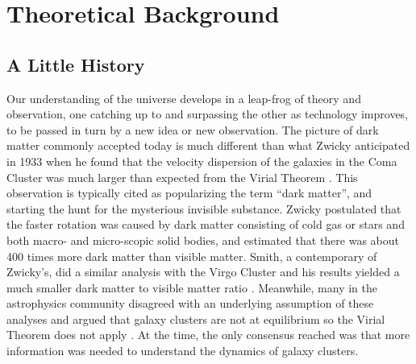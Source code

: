 \chapter{Theoretical Background }
\label{ch:theory} %


\section{A Little History}
Our understanding of the universe develops in a leap-frog of theory and observation, one catching up to and surpassing the other as technology improves, to be passed in turn by a new idea or new observation. The picture of dark matter commonly accepted today is much different than what Zwicky anticipated in 1933 when he found that the velocity dispersion of the galaxies in the Coma Cluster was much larger than expected from the Virial Theorem \cite{Zwicky1933}. This observation is typically cited as popularizing the term ``dark matter'', and starting the hunt for the mysterious invisible substance. Zwicky postulated that the faster rotation was caused by dark matter consisting of cold gas or stars and both macro- and micro-scopic solid bodies, and estimated that there was about 400 times more dark matter than visible matter. Smith, a contemporary of Zwicky's, did a similar analysis with the Virgo Cluster and his results yielded a much smaller dark matter to visible matter ratio \cite{Bertone2016}. Meanwhile, many in the astrophysics community disagreed with an underlying assumption of these analyses and argued that galaxy clusters are not at equilibrium so the Virial Theorem does not apply \cite{Bertone2016}. At the time, the only consensus reached was that more information was needed to understand the dynamics of galaxy clusters. 

